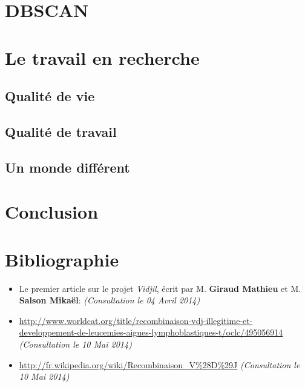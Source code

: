 \documentclass{report}
\begin{document}
\chapter{DBSCAN}


\chapter{Le travail en recherche}

\section{Qualité de vie}

\section{Qualité de travail}

\section{Un monde différent}


\chapter{Conclusion}


\chapter{Bibliographie}
\begin{itemize}
\item{Le premier article sur le projet \textit{Vidjil}, écrit par M. \textbf{Giraud Mathieu} et M. \textbf{Salson Mikaël}: \url{} \textit{(Consultation le 04 Avril 2014)}}
\item{\url{http://www.worldcat.org/title/recombinaison-vdj-illegitime-et-developpement-de-leucemies-aigues-lymphoblastiques-t/oclc/495056914} \textit{(Consultation le 10 Mai 2014)}}
\item{\url{http://fr.wikipedia.org/wiki/Recombinaison_V%28D%29J} \textit{(Consultation le 10 Mai 2014)}}
\end{itemize}
\end{document}
